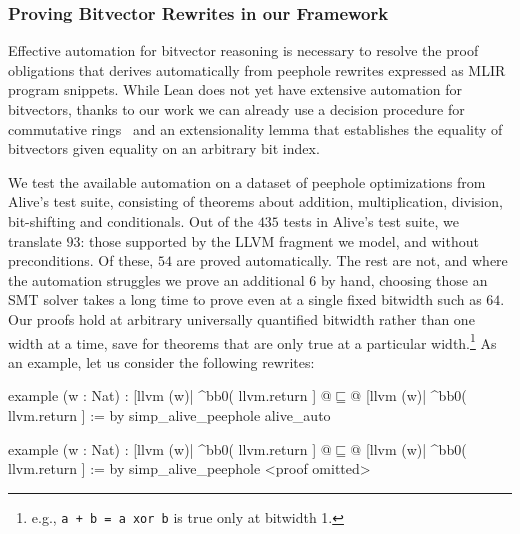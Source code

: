 \subsubsection{Proving Bitvector Rewrites in our Framework}

Effective automation for bitvector reasoning is necessary to resolve the proof obligations that  derives automatically from peephole rewrites expressed as MLIR program snippets.
While Lean does not yet have extensive automation for bitvectors, thanks to our work we can already use a decision procedure for commutative rings~\cite{gregoire2005proving} and an extensionality lemma that establishes the equality of bitvectors given equality on an arbitrary bit index.

We test the available automation on a dataset of peephole optimizations from Alive's test suite, consisting of theorems about addition, multiplication, division, bit-shifting and conditionals.
Out of the $435$ tests in Alive's test suite, we translate $93$: those supported by the LLVM fragment we model, and without preconditions.
Of these, $54$ are proved automatically.
The rest are not, and where the automation struggles we prove an additional $6$
by hand, choosing those an SMT solver takes a long time to prove even at a
single fixed bitwidth such as $64$.
Our proofs hold at arbitrary universally quantified bitwidth rather than one
width at a time, save for theorems that are only true at a particular
width.\footnote{e.g., \texttt{a + b = a xor b} is true only at bitwidth 1.}
As an example, let us consider the following rewrites:

\vspace{1mm}
\begin{minipage}{0.4\textwidth}
\begin{leanfootnotesize}

example (w : Nat) :
  [llvm (w)| {
    ^bb0(%
      llvm.return %
  }] @$\sqsubseteq$@ [llvm (w)| {
    ^bb0(%
      llvm.return %
  }] := by
    simp_alive_peephole
    alive_auto

\end{leanfootnotesize}
\end{minipage}
\begin{minipage}{0.4\textwidth}
\begin{leanfootnotesize}

example (w : Nat) :
  [llvm (w)| {
      ^bb0(%
        llvm.return %
    }] @$\sqsubseteq$@ [llvm (w)| {
      ^bb0(%
        llvm.return %
    }] := by
      simp_alive_peephole
      <proof omitted>
\end{leanfootnotesize}
\end{minipage}

